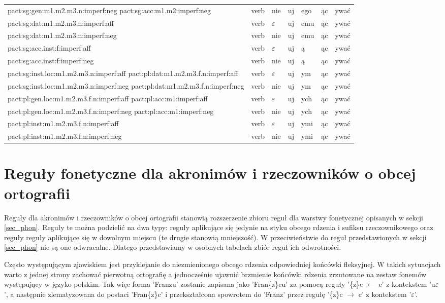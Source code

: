 \documentclass{article}
\begin{document}
\begin{longtable}{p{7cm}|l|l|l|l|l|l}
pact:sg:gen:m1.m2.m3.n:imperf:neg pact:sg:acc:m1.m2:imperf:neg & verb & nie & uj & ego & ąc & ywać\\
pact:sg:dat:m1.m2.m3.n:imperf:aff & verb & $\varepsilon$ & uj & emu & ąc & ywać\\
pact:sg:dat:m1.m2.m3.n:imperf:neg & verb & nie & uj & emu & ąc & ywać\\
pact:sg:acc.inst:f:imperf:aff & verb & $\varepsilon$ & uj & ą & ąc & ywać\\
pact:sg:acc.inst:f:imperf:neg & verb & nie & uj & ą & ąc & ywać\\
pact:sg:inst.loc:m1.m2.m3.n:imperf:aff pact:pl:dat:m1.m2.m3.f.n:imperf:aff & verb & $\varepsilon$ & uj & ym & ąc & ywać\\
pact:sg:inst.loc:m1.m2.m3.n:imperf:neg pact:pl:dat:m1.m2.m3.f.n:imperf:neg & verb & nie & uj & ym & ąc & ywać\\
pact:pl:gen.loc:m1.m2.m3.f.n:imperf:aff pact:pl:acc:m1:imperf:aff & verb & $\varepsilon$ & uj & ych & ąc & ywać\\
pact:pl:gen.loc:m1.m2.m3.f.n:imperf:neg pact:pl:acc:m1:imperf:neg & verb & nie & uj & ych & ąc & ywać\\
pact:pl:inst:m1.m2.m3.f.n:imperf:aff & verb & $\varepsilon$ & uj & ymi & ąc & ywać\\
pact:pl:inst:m1.m2.m3.f.n:imperf:neg & verb & nie & uj & ymi & ąc & ywać\\
\end{longtable}

\section{Reguły fonetyczne dla akronimów i rzeczowników o obcej ortografii}

Reguły dla akronimów i rzeczowników o obcej ortografii stanowią rozszerzenie zbioru reguł dla warstwy fonetycznej opisanych w sekcji \ref{sec_phon}.
Reguły te można podzielić na dwa typy: reguły aplikujące się jedynie na styku obcego rdzenia i sufiksu rzeczownikowego oraz
reguły reguły aplikujące się w dowolnym miejscu (te drugie stanowią mniejszość).
W przeciwieństwie do reguł przedstawionych w sekcji \ref{sec_phon} nie są one odwracalne. Dlatego przedstawiamy
w osobnych tabelach zbiór reguł ich odwrotności. 

Często występującym zjawiskiem jest przyklejanie do niezmienionego obcego rdzenia 
odpowiedniej końcówki fleksyjnej. W takich sytuacjach warto z jednej strony zachować pierwotną ortografię a jednocześnie 
ujawnić brzmienie końcówki rdzenia zrzutowane na zestaw fonemów występujący w języko polskim. Tak więc 
forma 'Franzu' zostanie zapisana jako 'Fran\{z\}cu' za pomocą reguły '\{z\}c $\leftarrow$ c' z kontekstem 'u$\varepsilon$', a
następnie zlematyzowana do postaci 'Fran\{z\}c' i przekształcona spowrotem do 'Franz' przez regułę '\{z\}c $\rightarrow$ c' z kontekstem '$\varepsilon$'.
\end{document}
